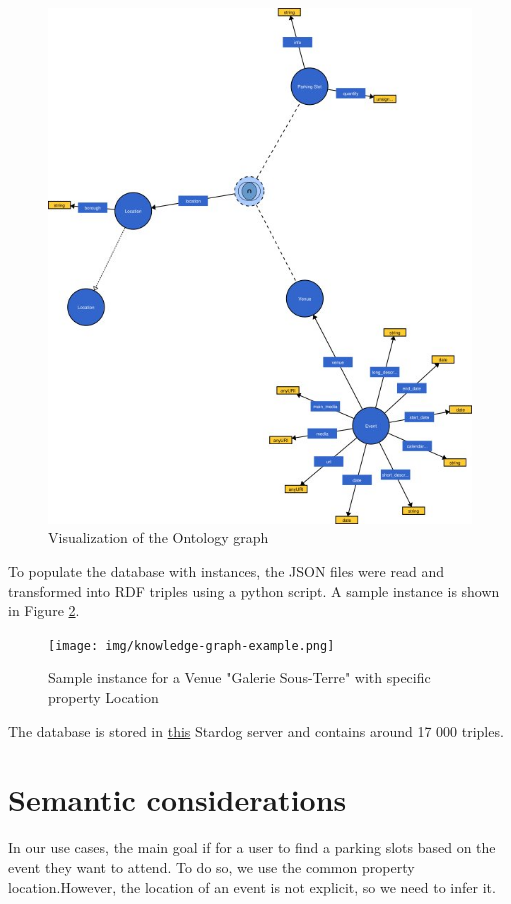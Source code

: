 \documentclass[runningheads,a4paper]{../../StyleFiles/llncs}
\begin{document}
\begin{figure}[h]
	\centering
	\includegraphics[width=.7\textwidth]{img/vocab-graph.jpg}
	\caption{Visualization of the Ontology graph}
	\label{fig:vocabulary}
\end{figure}

To populate the database with instances, the JSON files were read and transformed into RDF triples using a python script. A sample instance is shown in Figure \ref{fig:instance}. 

\begin{figure}[h]
	\centering
	\texttt{[image: img/knowledge-graph-example.png]}
	\caption{Sample instance for a Venue "Galerie Sous-Terre" with specific property Location}
	\label{fig:instance}
\end{figure}

The database is stored in \href{http://stardog.krw.d2s.labs.vu.nl/#/databases/group6}{this} Stardog server and contains around 17 000 triples. 



\section{Semantic considerations}
In our use cases, the main goal if for a user to find a parking slots based on the event they want to attend. To do so, we use the common property location.However, the location of an event is not explicit, so we need to infer it.
\end{document}
